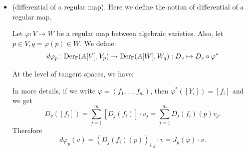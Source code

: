 \begin{itemize}
  \begin{example}
   Let $C=V(f_1,f_2), f_1 = X_1 - X_3^2, f_2 = X_2- X_3^3$. We have 
   \begin{equation}
    A[C] =\frac{\bbF[X_1,X_2,X_3]}{(f_1,f_2)}\to \bbF[X_3]:[g]\mapsto g(X_3^3,X_3^2,X_3).
   \end{equation}
   So $A[C]$ is a domain and we can define $K=\text{Frac}(A[C])$. We compute 
   \begin{equation}
    \text{Rank}_K([D_i(f_j)]) =
    \text{Rank}_K\begin{pmatrix}
       1&0& -2[X_3]\\ 0&1&-3[X_3]
    \end{pmatrix}=
    2.
   \end{equation}
   Then we conclude $\dim(V) = 3 - 2 =1$.
  \end{example}
  \item(differential of a regular map). Here we define the notion of differential of a regular map.
  \begin{definition}
    Let $\varphi:V\to W$ be a regular map between algebraic varieties. Also, let $p\in V, q = \varphi(p)\in W$. We define:
    \begin{equation}
        d\varphi_p: \text{Der}_{\mathbb{F}}(A[V],V_p)\to\text{Der}_{\mathbb{F}}(A[W],W_q):D_v\mapsto D_v\circ\varphi^*
    \end{equation}
  \end{definition}
  At the level of tangent spaces, we have:
  \begin{center}
  \end{center}

  In more details, if we write $\varphi=(f_1,\dots, f_m)$, then $\varphi^*([Y_i])=[f_i]$ and we get 
  \begin{equation}
    D_v([f_i]) = \sum_{j=1}^m[D_j(f_i)]\cdot v_j = \sum_{j=1}^m D_j(f_i)(p)v_j.
  \end{equation}
  Therefore 
  \begin{equation}
    d\varphi_p(v) = (D_j(f_i)(p))_{i,j} \cdot v = J_p(\varphi)\cdot v.
  \end{equation}


\end{itemize}
